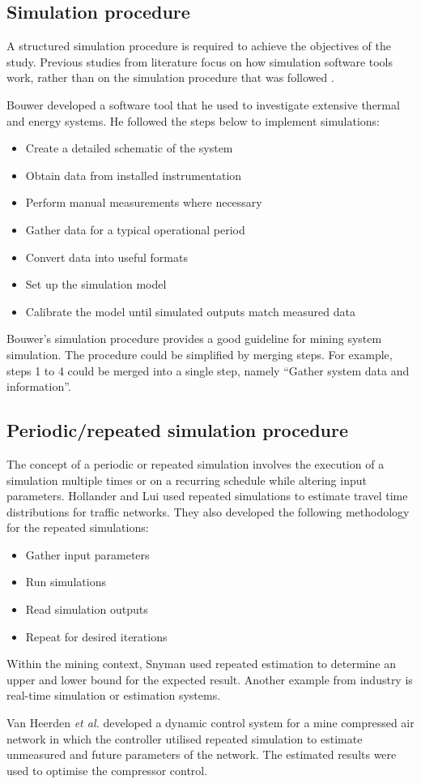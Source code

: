 	\subsection{Simulation procedure}
	A structured simulation procedure is required to achieve the objectives of the study. Previous studies from literature focus on how simulation software tools work, rather than on the simulation procedure that was followed \cite{Mare2016PhD}.
	\par
	Bouwer \cite{bouwer2004designing} developed a software tool that he used to investigate extensive thermal and energy systems. He followed the steps below to implement simulations:
	\begin{itemize}
		\item Create a detailed schematic of the system
		\item Obtain data from installed instrumentation
		\item Perform manual measurements where necessary
		\item Gather data for a typical operational period
		\item Convert data into useful formats
		\item Set up the simulation model
		\item Calibrate the model until simulated outputs match measured data
	\end{itemize}
	Bouwer's simulation procedure provides a good guideline for mining system simulation. The procedure could be simplified by merging steps. For example, steps 1 to 4 could be merged into a single step, namely \enquote{Gather system data and information}.
	\subsection{Periodic/repeated simulation procedure}
	The concept of a periodic or repeated simulation involves the execution of a simulation multiple times or on a recurring schedule while altering input parameters. Hollander and Lui \cite{Hollander2008Estimation} used repeated simulations to estimate travel time distributions for traffic networks. They also developed the following methodology for the repeated simulations:
	\begin{itemize}
		\item Gather input parameters
		\item Run simulations
		\item Read simulation outputs
		\item Repeat for desired iterations
	\end{itemize}
	\par
	 Within the mining context, Snyman \cite{Snyman2011Masters} used repeated estimation to determine an upper and lower bound for the expected result. Another example from industry is real-time simulation or estimation systems.
	\par 
	 Van Heerden \textit{et al.} \cite{van2014developing} developed a dynamic control system for a mine compressed air network in which the controller utilised repeated simulation to estimate unmeasured and future parameters of the network. The estimated results were used to optimise the compressor control.
	 \par
	
